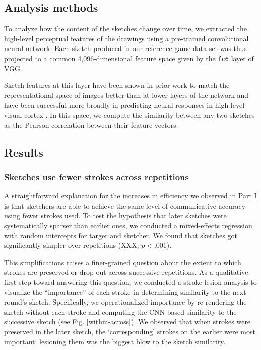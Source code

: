 \documentclass[10pt,letterpaper]{article}
\begin{document}

\subsection{Analysis methods}

To analyze how the content of the sketches change over time, we extracted the high-level perceptual features of the drawings using a pre-trained convolutional neural network. 
Each sketch produced in our reference game data set was thus projected to a common 4,096-dimensional feature space given by the \texttt{fc6} layer of VGG. 

Sketch features at this layer have been shown in prior work to match the representational space of images better than at lower layers of the network \cite{FanCommon2018} and have been successful more broadly in predicting neural responses in high-level visual cortex \cite{yamins2014performance}.
In this space, we compute the similarity between any two sketches as the Pearson correlation between their feature vectors.

\subsection{Results}

\subsubsection{Sketches use fewer strokes across repetitions}

A straightforward explanation for the increases in efficiency we observed in Part I is that sketchers are able to achieve the same level of communicative accuracy using fewer strokes used.
To test the hypothesis that later sketches were systematically sparser than earlier ones, we conducted a mixed-effects regression with random intercepts for target and sketcher.
We found that sketches got significantly simpler over repetitions (XXX; $p < .001$). 

This simplifications raises a finer-grained question about the extent to which strokes are preserved or drop out across successive repetitions.
As a qualitative first step toward answering this question, we conducted a stroke lesion analysis to visualize the ``importance'' of each stroke in determining similarity to the next round's sketch.
Specifically, we operationalized importance by re-rendering the sketch without each stroke and computing the CNN-based similarity to the successive sketch (see Fig. \ref{within-across}).
We observed that when strokes were preserved in the later sketch, the `corresponding' strokes on the earlier were most important: lesioning them was the biggest blow to the sketch similarity.  %
\end{document}
